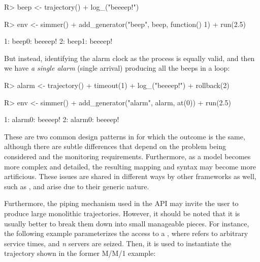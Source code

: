 \documentclass[
  nojss]{jss}
\begin{document}
\begin{CodeChunk}
\begin{CodeInput}
R> beep <- trajectory() %
+   log_("beeeep!")
\end{CodeInput}
\end{CodeChunk}

\begin{CodeChunk}
\begin{CodeInput}
R> env <- simmer() %
+   add_generator("beep", beep, function() 1) %
+   run(2.5)
\end{CodeInput}
\begin{CodeOutput}
1: beep0: beeeep!
2: beep1: beeeep!
\end{CodeOutput}
\end{CodeChunk}

But instead, identifying the alarm clock as the process is equally
valid, and then we have \emph{a single alarm} (single arrival) producing
all the beeps in a loop:

\begin{CodeChunk}
\begin{CodeInput}
R> alarm <- trajectory() %
+   timeout(1) %
+   log_("beeeep!") %
+   rollback(2)
\end{CodeInput}
\end{CodeChunk}

\begin{CodeChunk}
\begin{CodeInput}
R> env <- simmer() %
+   add_generator("alarm", alarm, at(0)) %
+   run(2.5)
\end{CodeInput}
\begin{CodeOutput}
1: alarm0: beeeep!
2: alarm0: beeeep!
\end{CodeOutput}
\end{CodeChunk}

These are two common design patterns in  for which the
outcome is the same, although there are subtle differences that depend
on the problem being considered and the monitoring requirements.
Furthermore, as a model becomes more complex and detailed, the resulting
mapping and syntax may become more artificious. These issues are shared
in different ways by other frameworks as well, such as , and
arise due to their generic nature.

Furthermore, the piping mechanism used in the  API may
invite the user to produce large monolithic trajectories. However, it
should be noted that it is usually better to break them down into small
manageable pieces. For instance, the following example parameterizes the
access to a , where  refers to arbitrary service
times, and \emph{n} servers are seized. Then, it is used to instantiate
the trajectory shown in the former M/M/1 example:
\end{document}
